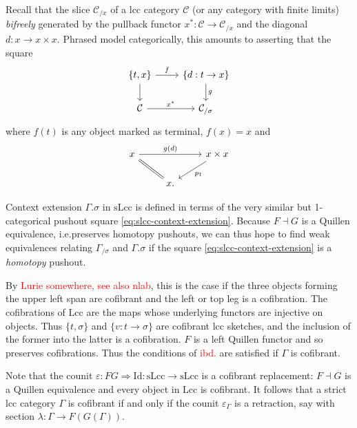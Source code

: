 \documentclass{article}
\newcommand{\todo}[1]{\textcolor{red}{#1}}
\theoremstyle{remark}
\theoremstyle{definition}
\begin{document}
Recall that the slice $\mathcal{C}_{/ x}$ of a lcc category $\mathcal{C}$ (or any category with finite limits) \emph{bifreely} generated by the pullback functor $x^* : \mathcal{C} \rightarrow \mathcal{C}_{/ x}$ and the diagonal $d : x \rightarrow x \times x$.
Phrased model categorically, this amounts to asserting that the square
\begin{equation}
  \label{eq:homotopy-pushout-lcc}
  \begin{tikzcd}
    \{ t, x \} \arrow[r, "f"] \arrow[d] & \{ d : t \rightarrow x \} \arrow[d, "g"] \\
    \mathcal{C} \arrow[r, "x^*"] & \mathcal{C}_{/ \sigma}
  \end{tikzcd}
\end{equation}
where $f(t)$ is any object marked as terminal, $f(x) = x$ and
\begin{equation}
  \begin{tikzcd}
    x \arrow[dr, equals] \arrow[rr, "g(d)"] && x \times x \arrow[dl, "p_1"] \\
    & x.
  \end{tikzcd}
\end{equation}

Context extension $\Gamma.\sigma$ in $\mathrm{sLcc}$ is defined in terms of the very similar but 1-categorical pushout square \eqref{eq:slcc-context-extension}.
Because $F \dashv G$ is a Quillen equivalence, i.e.\@ preserves homotopy pushouts, we can thus hope to find weak equivalences relating $\Gamma_{/ \sigma}$ and $\Gamma.\sigma$ if the square \eqref{eq:slcc-context-extension} is a \emph{homotopy} pushout.

By \todo{Lurie somewhere, see also nlab}, this is the case if the three objects forming the upper left span are cofibrant and the left or top leg is a cofibration.
The cofibrations of $\mathrm{Lcc}$ are the maps whose underlying functors are injective on objects.
Thus $\{t, \sigma\}$ and $\{ v : t \rightarrow \sigma\}$ are cofibrant lcc sketches, and the inclusion of the former into the latter is a cofibration.
$F$ is a left Quillen functor and so preserves cofibrations.
Thus the conditions of \todo{ibd.} are satisfied if $\Gamma$ is cofibrant.

Note that the counit $\varepsilon : FG \Rightarrow \mathrm{Id} : \mathrm{sLcc} \rightarrow \mathrm{sLcc}$ is a cofibrant replacement: $F \dashv G$ is a Quillen equivalence and every object in $\mathrm{Lcc}$ is cofibrant.
It follows that a strict lcc category $\Gamma$ is cofibrant if and only if the counit $\varepsilon_\Gamma$ is a retraction, say with section $\lambda : \Gamma \rightarrow F(G(\Gamma))$.
\end{document}
